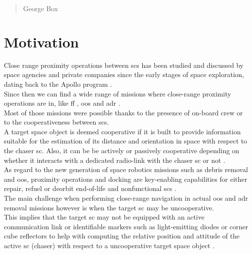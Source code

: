 \begin{quotation}
{\footnotesize
{}
\begin{flushright}
George Box
\end{flushright}
}
\end{quotation}
\vspace{0.5cm}

\section{Motivation}
Close range proximity operations between \acrfull{sc}s has been studied and discussed by space agencies and private companies since the early stages of space exploration, dating back to the Apollo program \cite{LangleyApollo}.\\
Since then we can find a wide range of missions where close-range proximity operations are in, like \acrfull{ff} \cite{2001FormationFliying}  \cite{2009FormationFliying}, \acrfull{oos} \cite{auricchio} \cite{Zimpfer2005} \cite{Tatsch2006} \cite{FloresAbad2014} and \acrfull{adr} \cite{clerc2012astrium} \cite{Bonnal2013}.\\
Most of those missions were possible thanks to the presence of on-board crew or to the cooperativeness between \acrshort{sc}s.\\
A target space object is deemed cooperative if it is built to provide information suitable for the estimation of its distance and orientation in space with respect to the chaser \acrshort{sc}. Also, it can be be actively or passively cooperative depending on whether it interacts with a dedicated radio-link with the chaser \acrshort{sc} or not \cite{Opromolla2017}.\\
As regard to the new generation of space robotics missions such as debris removal and \acrshort{oos}, proximity operations and docking are key-enabling capabilities for either repair, refuel or deorbit end-of-life and nonfunctional \acrshort{sc}s \cite{2016Ventura}.\\
The main challenge when performing close-range navigation in actual \acrshort{oos} and \acrshort{adr} removal missions however is when the target \acrshort{sc} may be uncooperative.\\
This implies that the target \acrshort{sc} may not be equipped with an active communication link or identifiable markers such as light-emitting diodes or corner cube reflectors to help with computing the relative position and attitude of the active \acrshort{sc} (chaser) with respect to a uncooperative target space object \cite{2019phdSharma}.\\
